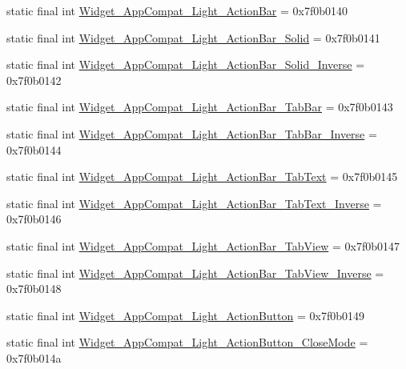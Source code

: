 \begin{CompactItemize}
\item 
static final int \hyperlink{classandroid_1_1support_1_1v7_1_1mediarouter_1_1_r_1_1style_cd24ba46c7ea9df52e273287b3e44d5c}{Widget\_\-AppCompat\_\-Light\_\-ActionBar} = 0x7f0b0140
\item 
static final int \hyperlink{classandroid_1_1support_1_1v7_1_1mediarouter_1_1_r_1_1style_32e4ed19f53479d2163fff33422553cf}{Widget\_\-AppCompat\_\-Light\_\-ActionBar\_\-Solid} = 0x7f0b0141
\item 
static final int \hyperlink{classandroid_1_1support_1_1v7_1_1mediarouter_1_1_r_1_1style_f5fc484604cc6b13ca8894b4756f2d40}{Widget\_\-AppCompat\_\-Light\_\-ActionBar\_\-Solid\_\-Inverse} = 0x7f0b0142
\item 
static final int \hyperlink{classandroid_1_1support_1_1v7_1_1mediarouter_1_1_r_1_1style_303d7eac0c3c82581c442ccc494f2c5e}{Widget\_\-AppCompat\_\-Light\_\-ActionBar\_\-TabBar} = 0x7f0b0143
\item 
static final int \hyperlink{classandroid_1_1support_1_1v7_1_1mediarouter_1_1_r_1_1style_acdc48c76b652bf06f5e4c9ffd6a4eee}{Widget\_\-AppCompat\_\-Light\_\-ActionBar\_\-TabBar\_\-Inverse} = 0x7f0b0144
\item 
static final int \hyperlink{classandroid_1_1support_1_1v7_1_1mediarouter_1_1_r_1_1style_61c2f6f3f5828a783ca506b20e22164b}{Widget\_\-AppCompat\_\-Light\_\-ActionBar\_\-TabText} = 0x7f0b0145
\item 
static final int \hyperlink{classandroid_1_1support_1_1v7_1_1mediarouter_1_1_r_1_1style_0922baba3cf5952e8fbbd6d66469f1bd}{Widget\_\-AppCompat\_\-Light\_\-ActionBar\_\-TabText\_\-Inverse} = 0x7f0b0146
\item 
static final int \hyperlink{classandroid_1_1support_1_1v7_1_1mediarouter_1_1_r_1_1style_cb2dcd076d4e1d38248cf7afd5cc467d}{Widget\_\-AppCompat\_\-Light\_\-ActionBar\_\-TabView} = 0x7f0b0147
\item 
static final int \hyperlink{classandroid_1_1support_1_1v7_1_1mediarouter_1_1_r_1_1style_956cf9d22267e0ab47a32de4062166f9}{Widget\_\-AppCompat\_\-Light\_\-ActionBar\_\-TabView\_\-Inverse} = 0x7f0b0148
\item 
static final int \hyperlink{classandroid_1_1support_1_1v7_1_1mediarouter_1_1_r_1_1style_66074b4d2cec3488f47f935c70e256f0}{Widget\_\-AppCompat\_\-Light\_\-ActionButton} = 0x7f0b0149
\item 
static final int \hyperlink{classandroid_1_1support_1_1v7_1_1mediarouter_1_1_r_1_1style_12d773feefac2225c1b8f1674eb2d415}{Widget\_\-AppCompat\_\-Light\_\-ActionButton\_\-CloseMode} = 0x7f0b014a

\end{CompactItemize}
